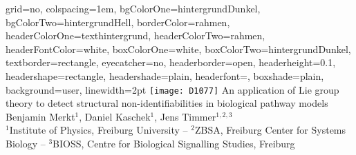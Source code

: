 \documentclass[portrait,final, fontscale=.34]{baposter}
\begin{document}
\newlength{\leftimgwidth}
\begin{poster}%
  {
  grid=no,
  colspacing=1em,
  bgColorOne=hintergrundDunkel,
  bgColorTwo=hintergrundHell,
  borderColor=rahmen,
  headerColorOne=texthintergrund,
  headerColorTwo=rahmen,
  headerFontColor=white,
  boxColorOne=white,
  boxColorTwo=hintergrundDunkel,
  textborder=rectangle,
  eyecatcher=no,
  headerborder=open,
  headerheight=0.1\textheight,
  headershape=rectangle,
  headershade=plain,
  headerfont=\Large\textsf, %
  boxshade=plain,
  background=user,
  linewidth=2pt
  }
  {\texttt{[image: D1077]}} %
  {\sf %
An application of Lie group theory to detect structural non-identifiabilities in biological pathway models
\vspace{0em}}
  {\sf %
  \vspace{0em}\Large{Benjamin Merkt$^{1}$, Daniel Kaschek$^1$, Jens Timmer$^{1,2,3}$\\
  \normalsize
  $^1$Institute of Physics, Freiburg University -- $^2$ZBSA, Freiburg Center for Systems Biology -- $^3$BIOSS, Centre for Biological Signalling Studies, Freiburg 
  }
  }
  {%
  }





\end{poster}
\end{document}
